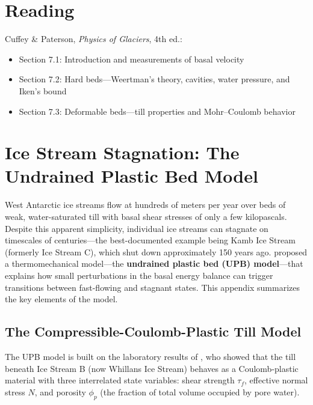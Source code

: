 \documentclass[11pt]{article}
\begin{document}
\clearpage
\section*{Reading}

Cuffey \& Paterson, \textit{Physics of Glaciers}, 4th ed.:
\begin{itemize}
  \item Section 7.1: Introduction and measurements of basal velocity
  \item Section 7.2: Hard beds---Weertman's theory, cavities, water pressure, and Iken's bound
  \item Section 7.3: Deformable beds---till properties and Mohr--Coulomb behavior
\end{itemize}

\clearpage
\appendix
\section{Ice Stream Stagnation: The Undrained Plastic Bed Model}
\label{sec:ice_stream_stagnation}

West Antarctic ice streams flow at hundreds of meters per year over beds of weak, water-saturated till with basal shear stresses of only a few kilopascals.  Despite this apparent simplicity, individual ice streams can stagnate on timescales of centuries---the best-documented example being Kamb Ice Stream (formerly Ice Stream C), which shut down approximately 150 years ago.  \cite{Tulaczyketal2000b} proposed a thermomechanical model---the \textbf{undrained plastic bed (UPB) model}---that explains how small perturbations in the basal energy balance can trigger transitions between fast-flowing and stagnant states.  This appendix summarizes the key elements of the model.

\subsection{The Compressible-Coulomb-Plastic Till Model}

The UPB model is built on the laboratory results of \cite{Tulaczyketal2000a}, who showed that the till beneath Ice Stream B (now Whillans Ice Stream) behaves as a Coulomb-plastic material with three interrelated state variables: shear strength $\tau_f$, effective normal stress $N$, and porosity $\phi_p$ (the fraction of total volume occupied by pore water).
\end{document}
